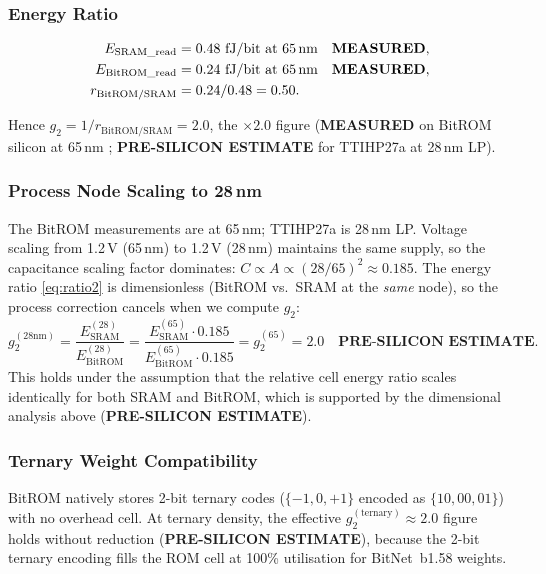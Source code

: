 \subsubsection{Energy Ratio}

\begin{align}
  E_{\mathrm{SRAM\_read}}   &= 0.48\text{ fJ/bit at 65\,nm} \quad \textbf{MEASURED},
    \label{eq:esram}\\
  E_{\mathrm{BitROM\_read}} &= 0.24\text{ fJ/bit at 65\,nm} \quad \textbf{MEASURED},
    \label{eq:ebitrom}\\
  r_{\mathrm{BitROM/SRAM}} &= 0.24/0.48 = 0.50. \label{eq:ratio2}
\end{align}

Hence \(g_{2} = 1/r_{\mathrm{BitROM/SRAM}} = 2.0\), the \(\times 2.0\) figure
(\textbf{MEASURED} on BitROM silicon at 65\,nm \cite{bitrom_2025};
\textbf{PRE-SILICON ESTIMATE} for TTIHP27a at 28\,nm LP).

\subsubsection{Process Node Scaling to 28\,nm}

The BitROM measurements are at 65\,nm; TTIHP27a is 28\,nm LP.  Voltage scaling
from 1.2\,V (65\,nm) to 1.2\,V (28\,nm) maintains the same supply, so the
capacitance scaling factor dominates: \(C \propto A \propto (28/65)^{2} \approx 0.185\).
The energy ratio \eqref{eq:ratio2} is dimensionless (BitROM vs.\ SRAM at the
\emph{same} node), so the process correction cancels when we compute \(g_{2}\):
\[
  g_{2}^{(28\mathrm{nm})} = \frac{E_{\mathrm{SRAM}}^{(28)}}{E_{\mathrm{BitROM}}^{(28)}}
  = \frac{E_{\mathrm{SRAM}}^{(65)} \cdot 0.185}{E_{\mathrm{BitROM}}^{(65)} \cdot 0.185}
  = g_{2}^{(65)} = 2.0
  \quad \textbf{PRE-SILICON ESTIMATE}.
\]
This holds under the assumption that the relative cell energy ratio scales
identically for both SRAM and BitROM, which is supported by the dimensional
analysis above (\textbf{PRE-SILICON ESTIMATE}).

\subsubsection{Ternary Weight Compatibility}

BitROM natively stores 2-bit ternary codes (\(\{-1,0,+1\}\) encoded as
\(\{10,00,01\}\)) with no overhead cell.  At ternary density, the effective
\(g_{2}^{(\mathrm{ternary})} \approx 2.0\) figure holds without reduction
(\textbf{PRE-SILICON ESTIMATE}), because the 2-bit ternary encoding fills the
ROM cell at 100\% utilisation for BitNet~b1.58 weights.

